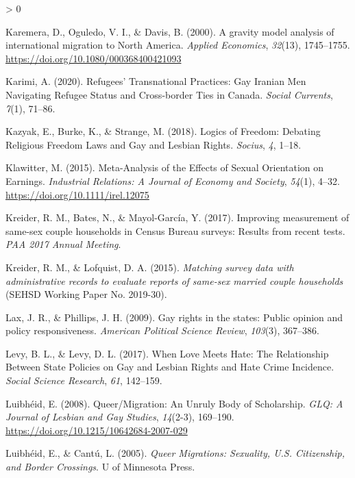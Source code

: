 \documentclass[
  11pt,
]{article}
\newlength{\cslhangindent}
\newenvironment{CSLReferences}[2] %
 {%
  \setlength{\parindent}{0pt}
  \ifodd #1 \everypar{\setlength{\hangindent}{\cslhangindent}}\ignorespaces\fi
  \ifnum #2 > 0
  \setlength{\parskip}{#2\baselineskip}
  \fi
 }%
 {}
\begin{document}
\begin{CSLReferences}{1}{0}
\leavevmode\hypertarget{ref-karemera_2000}{}%
Karemera, D., Oguledo, V. I., \& Davis, B. (2000). A gravity model analysis of international migration to {North America}. \emph{Applied Economics}, \emph{32}(13), 1745--1755. \url{https://doi.org/10.1080/000368400421093}

\leavevmode\hypertarget{ref-karimi_2020}{}%
Karimi, A. (2020). Refugees' {Transnational Practices}: {Gay Iranian Men Navigating Refugee Status} and {Cross}-border {Ties} in {Canada}. \emph{Social Currents}, \emph{7}(1), 71--86.

\leavevmode\hypertarget{ref-kazyak_2018}{}%
Kazyak, E., Burke, K., \& Strange, M. (2018). Logics of {Freedom}: {Debating Religious Freedom Laws} and {Gay} and {Lesbian Rights}. \emph{Socius}, \emph{4}, 1--18.

\leavevmode\hypertarget{ref-klawitter_2015}{}%
Klawitter, M. (2015). Meta-{Analysis} of the {Effects} of {Sexual Orientation} on {Earnings}. \emph{Industrial Relations: A Journal of Economy and Society}, \emph{54}(1), 4--32. \url{https://doi.org/10.1111/irel.12075}

\leavevmode\hypertarget{ref-kreider_2017}{}%
Kreider, R. M., Bates, N., \& Mayol-García, Y. (2017). Improving measurement of same-sex couple households in {Census Bureau} surveys: {Results} from recent tests. \emph{{PAA} 2017 Annual Meeting}.

\leavevmode\hypertarget{ref-kreider_2015}{}%
Kreider, R. M., \& Lofquist, D. A. (2015). \emph{Matching survey data with administrative records to evaluate reports of same-sex married couple households} (SEHSD Working Paper No. 2019-30).

\leavevmode\hypertarget{ref-lax_2009}{}%
Lax, J. R., \& Phillips, J. H. (2009). Gay rights in the states: {Public} opinion and policy responsiveness. \emph{American Political Science Review}, \emph{103}(3), 367--386.

\leavevmode\hypertarget{ref-levy_2017}{}%
Levy, B. L., \& Levy, D. L. (2017). When {Love Meets Hate}: {The Relationship Between State Policies} on {Gay} and {Lesbian Rights} and {Hate Crime Incidence}. \emph{Social Science Research}, \emph{61}, 142--159.

\leavevmode\hypertarget{ref-luibheid_2008}{}%
Luibhéid, E. (2008). Queer/{Migration}: {An Unruly Body} of {Scholarship}. \emph{GLQ: A Journal of Lesbian and Gay Studies}, \emph{14}(2-3), 169--190. \url{https://doi.org/10.1215/10642684-2007-029}

\leavevmode\hypertarget{ref-luibheid_2005}{}%
Luibhéid, E., \& Cantú, L. (2005). \emph{Queer {Migrations}: {Sexuality}, {U}.{S}. {Citizenship}, and {Border Crossings}}. {U of Minnesota Press}.


\end{CSLReferences}
\end{document}
